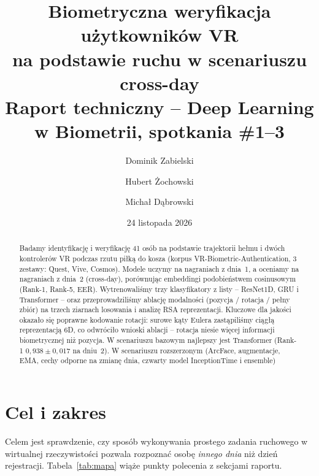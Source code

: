 \documentclass[11pt,a4paper]{article}
\title{\textbf{Biometryczna weryfikacja użytkowników VR\\na podstawie ruchu w scenariuszu cross-day}\\[4pt]
\large Raport techniczny -- Deep Learning w Biometrii, spotkania \#1--3}
\author{Dominik Zabielski \and Hubert Żochowski \and Michał Dąbrowski}
\date{24 listopada 2026}
\begin{document}
\maketitle

\begin{abstract}
\noindent
Badamy identyfikację i weryfikację 41 osób na podstawie trajektorii hełmu i dwóch kontrolerów VR
podczas rzutu piłką do kosza (korpus VR-Biometric-Authentication, 3 zestawy: Quest, Vive, Cosmos).
Modele uczymy na nagraniach z dnia~1, a oceniamy na nagraniach z dnia~2 (cross-day), porównując
embeddingi podobieństwem cosinusowym (Rank-1, Rank-5, EER). Wytrenowaliśmy trzy klasyfikatory z listy
-- ResNet1D, GRU i Transformer -- oraz przeprowadziliśmy ablację modalności (pozycja / rotacja / pełny
zbiór) na trzech ziarnach losowania i analizę RSA reprezentacji. Kluczowe dla jakości okazało się
poprawne kodowanie rotacji: surowe kąty Eulera zastąpiliśmy ciągłą reprezentacją 6D, co odwróciło
wnioski ablacji -- rotacja niesie więcej informacji biometrycznej niż pozycja. W scenariuszu bazowym
najlepszy jest Transformer (Rank-1 $0{,}938 \pm 0{,}017$ na dniu~2). W scenariuszu rozszerzonym
(ArcFace, augmentacje, EMA, cechy odporne na zmianę dnia, czwarty model InceptionTime i ensemble)

\end{abstract}

\tableofcontents
\newpage

\section{Cel i zakres}
Celem jest sprawdzenie, czy sposób wykonywania prostego zadania ruchowego w wirtualnej rzeczywistości
pozwala rozpoznać osobę \emph{innego dnia} niż dzień rejestracji. Tabela~\ref{tab:mapa} wiąże punkty
polecenia z sekcjami raportu.
\end{document}
